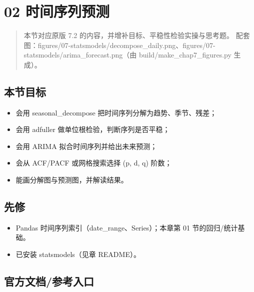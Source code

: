 \section{02 时间序列预测}\label{ux65f6ux95f4ux5e8fux5217ux9884ux6d4b}

\begin{quote}
本节对应原版 7.2 的内容，并增补目标、平稳性检验实操与思考题。
配套图：figures/07-statsmodels/decompose\_daily.png、figures/07-statsmodels/arima\_forecast.png（由
build/make\_chap7\_figures.py 生成）。
\end{quote}

\subsection{本节目标}\label{ux672cux8282ux76eeux6807-27}

\begin{itemize}
\tightlist
\item
  会用 seasonal\_decompose 把时间序列分解为趋势、季节、残差；
\item
  会用 adfuller 做单位根检验，判断序列是否平稳；
\item
  会用 ARIMA 拟合时间序列并给出未来预测；
\item
  会从 ACF/PACF 或网格搜索选择 (p, d, q) 阶数；
\item
  能画分解图与预测图，并解读结果。
\end{itemize}

\subsection{先修}\label{ux5148ux4fee-20}

\begin{itemize}
\tightlist
\item
  Pandas 时间序列索引（date\_range、Series）；本章第 01
  节的回归/统计基础。
\item
  已安装 statsmodels（见章 README）。
\end{itemize}

\subsection{官方文档/参考入口}\label{ux5b98ux65b9ux6587ux6863ux53c2ux8003ux5165ux53e3-6}

